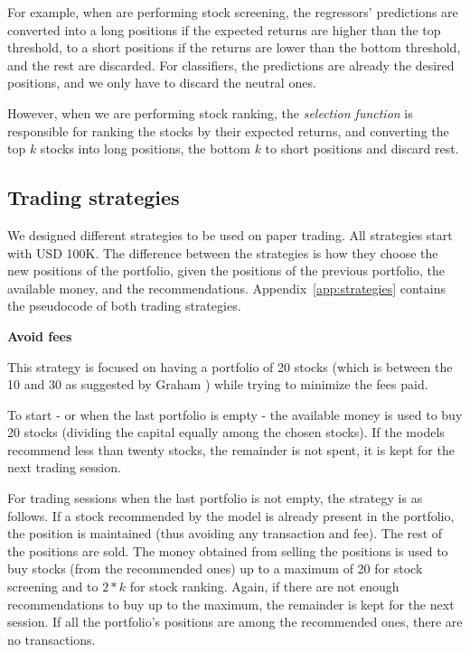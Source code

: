 For example, when are performing stock screening, the regressors' predictions are converted into a long positions if the expected returns are higher than the top threshold, to a short positions if the returns are lower than the bottom threshold, and the rest are discarded. For classifiers, the predictions are already the desired positions, and we only have to discard the neutral ones.

However, when we are performing stock ranking, the \textit{selection function} is responsible for ranking the stocks by their expected returns, and converting the top $k$ stocks into long positions, the bottom $k$ to short positions and discard rest.

\subsection{Trading strategies}
\label{subsec:strategies}
We designed different strategies to be used on paper trading. All strategies start with USD 100K. The difference between the strategies is how they choose the new positions of the portfolio, given the positions of the previous portfolio, the available money, and the recommendations. Appendix~\ref{app:strategies} contains the pseudocode of both trading strategies.

\textbf{Avoid fees}

This strategy is focused on having a portfolio of 20 stocks (which is between the 10 and 30 as suggested by Graham \cite{grahambook}) while trying to minimize the fees paid. 

To start - or when the last portfolio is empty - the available money is used to buy 20 stocks (dividing the capital equally among the chosen stocks). If the models recommend less than twenty stocks, the remainder is not spent, it is kept for the next trading session.


For trading sessions when the last portfolio is not empty, the strategy is as follows. If a stock recommended by the model is already present in the portfolio, the position is maintained (thus avoiding any transaction and fee). The rest of the positions are sold. The money obtained from selling the positions is used to buy stocks (from the recommended ones) up to a maximum of 20 for stock screening and to $2*k$ for stock ranking.
Again, if there are not enough recommendations to buy up to the maximum, the remainder is kept for the next session. If all the portfolio's positions are among the recommended ones, there are no transactions. 

